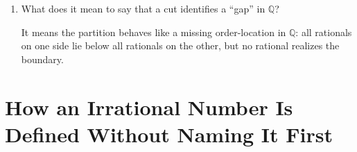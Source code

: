 \documentclass{self-check}
\begin{document}
\begin{enumerate}[label=\arabic{*}., itemsep=10pt]
    \begin{answer}
      No. The cut itself specifies a position in the ordering even when no rational lies exactly at that position.
    \end{answer}
  \item What does it mean to say that a cut identifies a ``gap'' in \(\mathbb{Q}\)?

    \begin{answer}
      It means the partition behaves like a missing order-location in \(\mathbb{Q}\): all rationals on one side lie below all rationals on the other, but no rational realizes the boundary.
    \end{answer}
\end{enumerate}

\section{How an Irrational Number Is Defined Without Naming It First}
\end{document}
